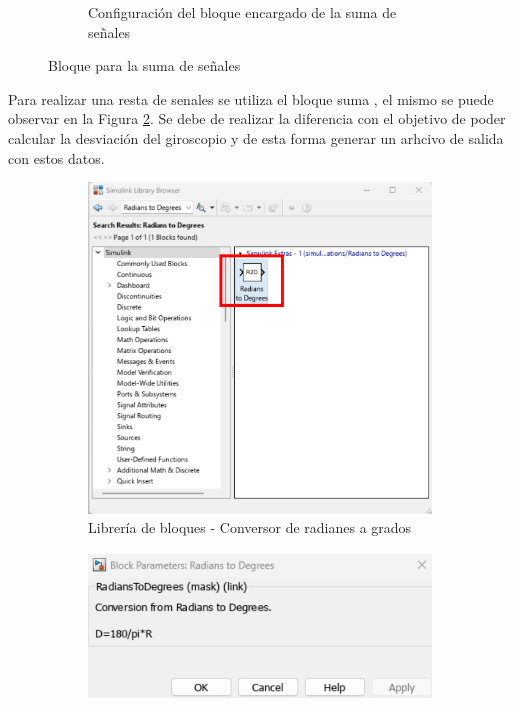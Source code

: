 \begin{figure}[htbp]
\begin{subfigure}[b]{0.45\textwidth}
        \caption{Configuración del bloque encargado de la suma de señales}
        \label{fig:config_add_IMU}
    \end{subfigure}
    \caption{Bloque para la suma de señales}
    \label{fig:add_of_some_signals}
\end{figure}

Para realizar una resta de senales se utiliza el bloque suma , el mismo se puede observar en la Figura \ref{fig:add_of_some_signals}. Se debe de realizar la diferencia con el objetivo de poder calcular la desviación del giroscopio y de esta forma generar un arhcivo de salida con estos datos. 


\begin{figure}[htbp]
    \centering
    \begin{subfigure}[b]{0.35\textwidth}
        \centering
        \includegraphics[width=\textwidth]{fig/Capitulo5/Caso_de_estudio_IMU/Generador_de_salidas/libreria_bloque__rad_2_deg.pdf}
        \caption{Librería de bloques - Conversor de radianes a grados}
        \label{fig:lib_bloques_R2D}
    \end{subfigure}
    \hfill
    \begin{subfigure}[b]{0.45\textwidth}
        \centering
        \includegraphics[width=\textwidth]{fig/Capitulo5/Caso_de_estudio_IMU//Generador_de_salidas/configuracion_rad_2_deg.pdf}

\end{subfigure}
\end{figure}
